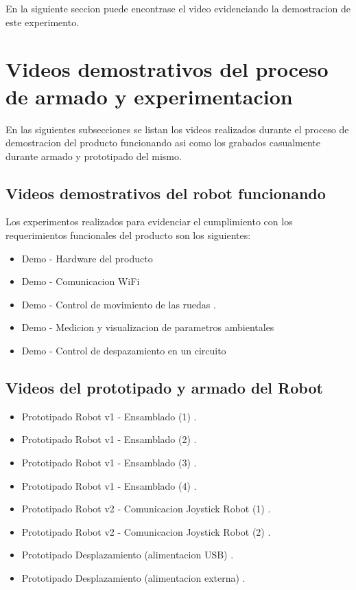 En la siguiente seccion puede encontrase el video \cite{DemoMediciones} evidenciando la demostracion de este experimento.

\section{Videos demostrativos del proceso de armado y experimentacion}

En las siguientes subsecciones se listan los videos realizados durante el proceso de demostracion del producto funcionando asi como los grabados casualmente durante armado y prototipado del mismo.


\subsection{Videos demostrativos del robot funcionando}

Los experimentos realizados para evidenciar el cumplimiento con los requerimientos funcionales del producto son los siguientes:
\begin{itemize}
	\item Demo - Hardware del producto \cite{DemoHardware}
	\item Demo - Comunicacion WiFi \cite{DemoComWifi}
	\item Demo - Control de movimiento de las ruedas \cite{Video_Demo_Control_Movimiento_1}.
	\item Demo - Medicion y visualizacion de parametros ambientales \cite{DemoMediciones}
	\item Demo - Control de despazamiento en un circuito \cite{Video_Demo_Control_Movimiento_2}
\end{itemize}


\subsection{Videos del prototipado y armado del Robot}

\begin{itemize}
	\item Prototipado Robot v1 - Ensamblado  (1) \cite{Prototipado_Ensamblado_1}.	
	\item Prototipado Robot v1 - Ensamblado  (2) \cite{Prototipado_Ensamblado_2}.
	\item Prototipado Robot v1 - Ensamblado  (3) \cite{Prototipado_Ensamblado_3}.
	\item Prototipado Robot v1 - Ensamblado  (4) \cite{Prototipado_Ensamblado_4}.
	\item Prototipado Robot v2 - Comunicacion Joystick Robot (1) \cite{Prototipado_Comunicacion_JoystickRobot1}.
	\item Prototipado Robot v2 - Comunicacion Joystick Robot (2) \cite{Prototipado_Comunicacion_JoystickRobot2}.
	\item Prototipado Desplazamiento (alimentacion USB) \cite{Prototipado_Desplazamiento_USB}.
	\item Prototipado Desplazamiento (alimentacion externa) \cite{Prototipado_Desplazamiento_USB}.

	
\end{itemize}


